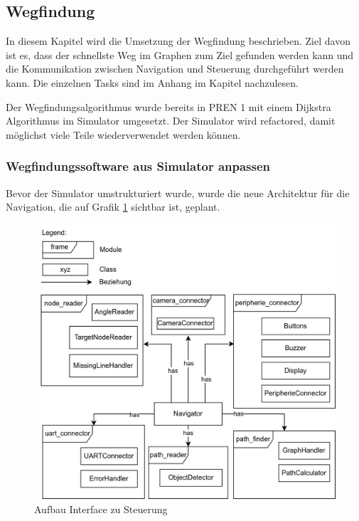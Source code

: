 \subsection{Wegfindung}

In diesem Kapitel wird die Umsetzung der Wegfindung beschrieben. Ziel davon ist es, dass der schnellste Weg im Graphen zum Ziel gefunden werden kann und die Kommunikation zwischen Navigation und Steuerung durchgeführt werden kann. Die einzelnen Tasks sind im Anhang im Kapitel  nachzulesen.

Der Wegfindungsalgorithmus wurde bereits in PREN 1 mit einem Dijkstra Algorithmus im Simulator umgesetzt. Der Simulator wird refactored, damit möglichst viele Teile wiederverwendet werden können.

\subsubsection{Wegfindungssoftware aus Simulator anpassen}
\label{navigation-arch}

Bevor der Simulator umstrukturiert wurde, wurde die neue Architektur für die Navigation, die auf Grafik \ref{fig:nav-arch} sichtbar ist, geplant.

\begin{figure}[H]
\centering
\includegraphics[width=\textwidth]{assets/IT/robot-sw-architecture-arch.png}
\caption{Aufbau Interface zu Steuerung}
\label{fig:nav-arch}
\end{figure}


